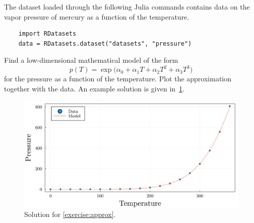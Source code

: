 \begin{compexercise}
    \label{exercise:approx}
    The dataset loaded through the following Julia commands contains data on the vapor pressure of mercury as a function of the temperature.
    \begin{verbatim}
    import RDatasets
    data = RDatasets.dataset("datasets", "pressure")
    \end{verbatim}
    Find a low-dimensional mathematical model of the form
    \begin{equation}
        p(T) = \exp \bigl( \alpha_0 + \alpha_1 T + \alpha_2 T^2 + \alpha_3 T^3 \bigr)
    \end{equation}
    for the pressure as a function of the temperature.
    Plot the approximation together with the data.
    An example solution is given in~\cref{fig:pressure}.
    \begin{figure}[ht]
        \centering
        \includegraphics[width=0.75\linewidth]{figures/pressure_model.pdf}
        \caption{Solution for \cref{exercise:approx}.}%
        \label{fig:pressure}
    \end{figure}
\end{compexercise}

